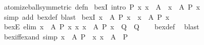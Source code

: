 \begin{isabellebody}
\isamarkupfalse%
\ atomize{\isacharunderscore}{\kern0pt}ball{\isacharbrackleft}{\kern0pt}symmetric{\isacharcomma}{\kern0pt}\ defn{\isacharbrackright}{\kern0pt}\isanewline
\isanewline
{}\isamarkupfalse%
\ bexI\ {\isacharbrackleft}{\kern0pt}intro{\isacharbrackright}{\kern0pt}{\isacharcolon}{\kern0pt}\ {\isachardoublequoteopen}{\isasymlbrakk}P\ x{\isacharsemicolon}{\kern0pt}\ x\ {\isasymin}\ A{\isasymrbrakk}\ {\isasymLongrightarrow}\ {\isasymexists}x\ {\isasymin}\ A{\isachardot}{\kern0pt}\ P\ x{\isachardoublequoteclose}\isanewline
%
\isadelimproof
\ \ %
\endisadelimproof
%
\isatagproof
{}\isamarkupfalse%
\ {\isacharparenleft}{\kern0pt}simp\ add{\isacharcolon}{\kern0pt}\ bex{\isacharunderscore}{\kern0pt}def{\isacharcomma}{\kern0pt}\ blast{\isacharparenright}{\kern0pt}%
\endisatagproof
{\isafoldproof}%
%
\isadelimproof
\isanewline
%
\endisadelimproof
\isanewline
\isanewline
{}\isamarkupfalse%
\ bexI{\isacharprime}{\kern0pt}{\isacharcolon}{\kern0pt}\ {\isachardoublequoteopen}{\isasymlbrakk}x\ {\isasymin}\ A{\isacharsemicolon}{\kern0pt}\ P\ x{\isasymrbrakk}\ {\isasymLongrightarrow}\ {\isasymexists}x\ {\isasymin}\ A{\isachardot}{\kern0pt}\ P\ x{\isachardoublequoteclose}%
\isadelimproof
\ %
\endisadelimproof
%
\isatagproof
\isacommand{{\isachardot}{\kern0pt}{\isachardot}{\kern0pt}}\isamarkupfalse%
%
\endisatagproof
{\isafoldproof}%
%
\isadelimproof
%
\endisadelimproof
\isanewline
\isanewline
{}\isamarkupfalse%
\ bexE\ {\isacharbrackleft}{\kern0pt}elim{\isacharbang}{\kern0pt}{\isacharbrackright}{\kern0pt}{\isacharcolon}{\kern0pt}\ {\isachardoublequoteopen}{\isasymlbrakk}{\isasymexists}x\ {\isasymin}\ A{\isachardot}{\kern0pt}\ P\ x{\isacharsemicolon}{\kern0pt}\ {\isasymAnd}x{\isachardot}{\kern0pt}\ {\isasymlbrakk}x\ {\isasymin}\ A{\isacharsemicolon}{\kern0pt}\ P\ x{\isasymrbrakk}\ {\isasymLongrightarrow}\ Q{\isasymrbrakk}\ {\isasymLongrightarrow}\ Q{\isachardoublequoteclose}\isanewline
%
\isadelimproof
\ \ %
\endisadelimproof
%
\isatagproof
{}\isamarkupfalse%
\ bex{\isacharunderscore}{\kern0pt}def\ \isamarkupfalse%
\ blast%
\endisatagproof
{\isafoldproof}%
%
\isadelimproof
\isanewline
%
\endisadelimproof
\isanewline
\isanewline
{}\isamarkupfalse%
\ bex{\isacharunderscore}{\kern0pt}iff{\isacharunderscore}{\kern0pt}ex{\isacharunderscore}{\kern0pt}and\ {\isacharbrackleft}{\kern0pt}simp{\isacharbrackright}{\kern0pt}{\isacharcolon}{\kern0pt}\ {\isachardoublequoteopen}{\isacharparenleft}{\kern0pt}{\isasymexists}x\ {\isasymin}\ A{\isachardot}{\kern0pt}\ P{\isacharparenright}{\kern0pt}\ {\isasymlongleftrightarrow}\ {\isacharparenleft}{\kern0pt}{\isacharparenleft}{\kern0pt}{\isasymexists}x{\isachardot}{\kern0pt}\ x\ {\isasymin}\ A{\isacharparenright}{\kern0pt}\ {\isasymand}\ P{\isacharparenright}{\kern0pt}{\isachardoublequoteclose}\isanewline

\end{isabellebody}

